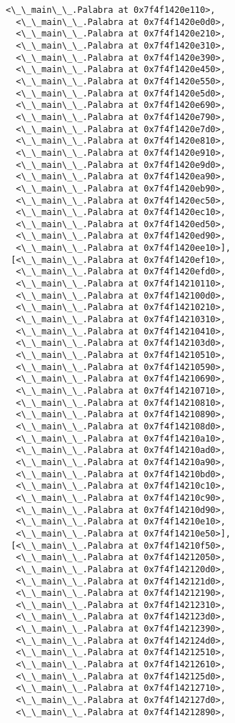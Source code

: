 \documentclass[12pt,a4paper,table]{article}
\begin{document}
\begin{tcolorbox}[breakable, size=fbox, boxrule=.5pt, pad at break*=1mm, opacityfill=0]
\begin{Verbatim}[commandchars=\\\{\}]
  <\_\_main\_\_.Palabra at 0x7f4f1420e110>,
  <\_\_main\_\_.Palabra at 0x7f4f1420e0d0>,
  <\_\_main\_\_.Palabra at 0x7f4f1420e210>,
  <\_\_main\_\_.Palabra at 0x7f4f1420e310>,
  <\_\_main\_\_.Palabra at 0x7f4f1420e390>,
  <\_\_main\_\_.Palabra at 0x7f4f1420e450>,
  <\_\_main\_\_.Palabra at 0x7f4f1420e550>,
  <\_\_main\_\_.Palabra at 0x7f4f1420e5d0>,
  <\_\_main\_\_.Palabra at 0x7f4f1420e690>,
  <\_\_main\_\_.Palabra at 0x7f4f1420e790>,
  <\_\_main\_\_.Palabra at 0x7f4f1420e7d0>,
  <\_\_main\_\_.Palabra at 0x7f4f1420e810>,
  <\_\_main\_\_.Palabra at 0x7f4f1420e910>,
  <\_\_main\_\_.Palabra at 0x7f4f1420e9d0>,
  <\_\_main\_\_.Palabra at 0x7f4f1420ea90>,
  <\_\_main\_\_.Palabra at 0x7f4f1420eb90>,
  <\_\_main\_\_.Palabra at 0x7f4f1420ec50>,
  <\_\_main\_\_.Palabra at 0x7f4f1420ec10>,
  <\_\_main\_\_.Palabra at 0x7f4f1420ed50>,
  <\_\_main\_\_.Palabra at 0x7f4f1420ed90>,
  <\_\_main\_\_.Palabra at 0x7f4f1420ee10>],
 [<\_\_main\_\_.Palabra at 0x7f4f1420ef10>,
  <\_\_main\_\_.Palabra at 0x7f4f1420efd0>,
  <\_\_main\_\_.Palabra at 0x7f4f14210110>,
  <\_\_main\_\_.Palabra at 0x7f4f142100d0>,
  <\_\_main\_\_.Palabra at 0x7f4f14210210>,
  <\_\_main\_\_.Palabra at 0x7f4f14210310>,
  <\_\_main\_\_.Palabra at 0x7f4f14210410>,
  <\_\_main\_\_.Palabra at 0x7f4f142103d0>,
  <\_\_main\_\_.Palabra at 0x7f4f14210510>,
  <\_\_main\_\_.Palabra at 0x7f4f14210590>,
  <\_\_main\_\_.Palabra at 0x7f4f14210690>,
  <\_\_main\_\_.Palabra at 0x7f4f14210710>,
  <\_\_main\_\_.Palabra at 0x7f4f14210810>,
  <\_\_main\_\_.Palabra at 0x7f4f14210890>,
  <\_\_main\_\_.Palabra at 0x7f4f142108d0>,
  <\_\_main\_\_.Palabra at 0x7f4f14210a10>,
  <\_\_main\_\_.Palabra at 0x7f4f14210ad0>,
  <\_\_main\_\_.Palabra at 0x7f4f14210a90>,
  <\_\_main\_\_.Palabra at 0x7f4f14210bd0>,
  <\_\_main\_\_.Palabra at 0x7f4f14210c10>,
  <\_\_main\_\_.Palabra at 0x7f4f14210c90>,
  <\_\_main\_\_.Palabra at 0x7f4f14210d90>,
  <\_\_main\_\_.Palabra at 0x7f4f14210e10>,
  <\_\_main\_\_.Palabra at 0x7f4f14210e50>],
 [<\_\_main\_\_.Palabra at 0x7f4f14210f50>,
  <\_\_main\_\_.Palabra at 0x7f4f14212050>,
  <\_\_main\_\_.Palabra at 0x7f4f142120d0>,
  <\_\_main\_\_.Palabra at 0x7f4f142121d0>,
  <\_\_main\_\_.Palabra at 0x7f4f14212190>,
  <\_\_main\_\_.Palabra at 0x7f4f14212310>,
  <\_\_main\_\_.Palabra at 0x7f4f142123d0>,
  <\_\_main\_\_.Palabra at 0x7f4f14212390>,
  <\_\_main\_\_.Palabra at 0x7f4f142124d0>,
  <\_\_main\_\_.Palabra at 0x7f4f14212510>,
  <\_\_main\_\_.Palabra at 0x7f4f14212610>,
  <\_\_main\_\_.Palabra at 0x7f4f142125d0>,
  <\_\_main\_\_.Palabra at 0x7f4f14212710>,
  <\_\_main\_\_.Palabra at 0x7f4f142127d0>,
  <\_\_main\_\_.Palabra at 0x7f4f14212890>,

\end{Verbatim}
\end{tcolorbox}
\end{document}
